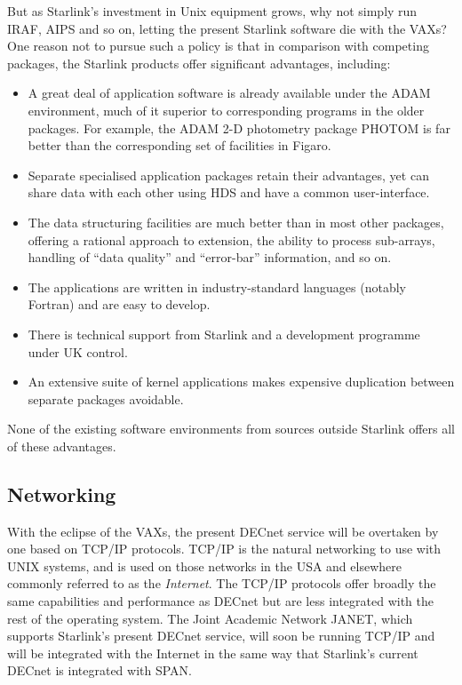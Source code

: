 But as Starlink's investment in Unix equipment grows, why not simply run
IRAF, AIPS and so on, letting the present Starlink software die with the
VAXs?  One reason not to pursue such a policy is that in comparison with
competing packages, the Starlink products offer significant advantages,
including:
\begin{itemize}
\item A great deal of application software is already available under
the ADAM environment, much of it superior to corresponding programs in
the older packages.  For example, the ADAM 2-D photometry package
PHOTOM is far better than the corresponding set of facilities in Figaro.
\item Separate specialised application packages retain their advantages,
yet can share data with each other using HDS and have a common
user-interface.
\item The data structuring facilities are much better than in most other
packages, offering a rational approach to extension, the ability to
process sub-arrays, handling of ``data quality'' and ``error-bar''
information, and so on.
\item The applications are written in industry-standard languages
(notably Fortran) and are easy to develop.
\item There is technical support from Starlink and a development
programme under UK control.
\item An extensive suite of kernel applications makes expensive
duplication between separate packages avoidable.
\end{itemize}
None of the existing software environments from sources outside Starlink
offers all of these advantages.

\subsection{Networking}
With the eclipse of the VAXs, the present DECnet service will be
overtaken by one based on TCP/IP protocols.  TCP/IP is the natural
networking to use with UNIX systems, and is used on those networks in
the USA and elsewhere commonly referred to as the {\it Internet}.  The
TCP/IP protocols offer broadly the same capabilities and performance as
DECnet but are less integrated with the rest of the operating system.
The Joint Academic Network JANET, which supports Starlink's present
DECnet service, will soon be running TCP/IP and will be integrated with
the Internet in the same way that Starlink's current DECnet is
integrated with SPAN.

